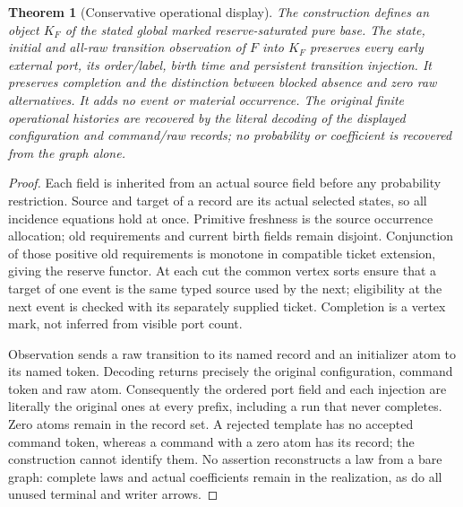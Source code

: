 \documentclass[11pt]{article}
\newtheorem{theorem}{Theorem}\newtheorem{proposition}{Proposition}
\begin{document}
\begin{theorem}[Conservative operational display]
The construction defines an object $K_F$ of the stated global marked reserve-saturated pure base. The state, initial and all-raw transition observation of $F$ into $K_F$ preserves every early external port, its order/label, birth time and persistent transition injection. It preserves completion and the distinction between blocked absence and zero raw alternatives. It adds no event or material occurrence. The original finite operational histories are recovered by the literal decoding of the displayed configuration and command/raw records; no probability or coefficient is recovered from the graph alone.
\end{theorem}
\begin{proof}
Each field is inherited from an actual source field before any probability restriction. Source and target of a record are its actual selected states, so all incidence equations hold at once. Primitive freshness is the source occurrence allocation; old requirements and current birth fields remain disjoint. Conjunction of those positive old requirements is monotone in compatible ticket extension, giving the reserve functor. At each cut the common vertex sorts ensure that a target of one event is the same typed source used by the next; eligibility at the next event is checked with its separately supplied ticket. Completion is a vertex mark, not inferred from visible port count.

Observation sends a raw transition to its named record and an initializer atom to its named token. Decoding returns precisely the original configuration, command token and raw atom. Consequently the ordered port field and each injection are literally the original ones at every prefix, including a run that never completes. Zero atoms remain in the record set. A rejected template has no accepted command token, whereas a command with a zero atom has its record; the construction cannot identify them. No assertion reconstructs a law from a bare graph: complete laws and actual coefficients remain in the realization, as do all unused terminal and writer arrows.\end{proof}
\end{document}
